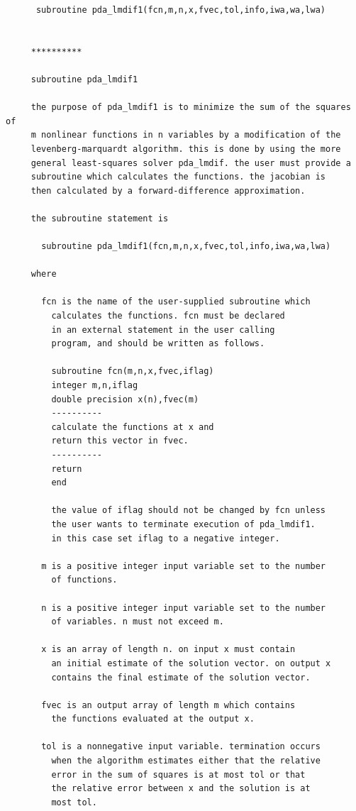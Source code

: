 \documentclass[11pt,twoside]{article}
\begin{document}
\begin{verbatim}
      subroutine pda_lmdif1(fcn,m,n,x,fvec,tol,info,iwa,wa,lwa)


     **********

     subroutine pda_lmdif1

     the purpose of pda_lmdif1 is to minimize the sum of the squares of
     m nonlinear functions in n variables by a modification of the
     levenberg-marquardt algorithm. this is done by using the more
     general least-squares solver pda_lmdif. the user must provide a
     subroutine which calculates the functions. the jacobian is
     then calculated by a forward-difference approximation.

     the subroutine statement is

       subroutine pda_lmdif1(fcn,m,n,x,fvec,tol,info,iwa,wa,lwa)

     where

       fcn is the name of the user-supplied subroutine which
         calculates the functions. fcn must be declared
         in an external statement in the user calling
         program, and should be written as follows.

         subroutine fcn(m,n,x,fvec,iflag)
         integer m,n,iflag
         double precision x(n),fvec(m)
         ----------
         calculate the functions at x and
         return this vector in fvec.
         ----------
         return
         end

         the value of iflag should not be changed by fcn unless
         the user wants to terminate execution of pda_lmdif1.
         in this case set iflag to a negative integer.

       m is a positive integer input variable set to the number
         of functions.

       n is a positive integer input variable set to the number
         of variables. n must not exceed m.

       x is an array of length n. on input x must contain
         an initial estimate of the solution vector. on output x
         contains the final estimate of the solution vector.

       fvec is an output array of length m which contains
         the functions evaluated at the output x.

       tol is a nonnegative input variable. termination occurs
         when the algorithm estimates either that the relative
         error in the sum of squares is at most tol or that
         the relative error between x and the solution is at
         most tol.


\end{verbatim}
\end{document}

